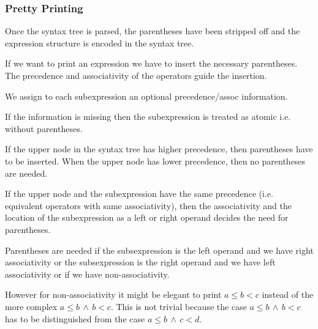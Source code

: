 \subsubsection{Pretty Printing}

Once the syntax tree is parsed, the parentheses have been stripped off and the
expression structure is encoded in the syntax tree.

If we want to print an expression we have to insert the necessary parentheses.
The precedence and associativity of the operators guide the insertion.

We assign to each subexpression an optional precedence/assoc information.

If the information is missing then the subexpression is treated as atomic i.e.
without parentheses.

If the upper node in the syntax tree has higher precedence, then parentheses
have to be inserted. When the upper node has lower precedence, then no
parentheses are needed.

If the upper node and the subexpression have the same precedence (i.e.
equivalent operators with same associativity), then the associativity and the
location of the subexpression as a left or right operand decides the need for
parentheses.

Parentheses are needed if the subsexpression is the left operand and we have
right associativity or the subsexpression is the right operand and we have
left associativity or if we have non-associativity.

However for non-associativity it might be elegant to print $a \le b < c$
instead of the more complex $a \le b \,\land\, b < c$. This is not trivial
because the case $a \le b \,\land\, b < c$ has to be distinguished from the
case $a \le b \,\land\, c < d$.








